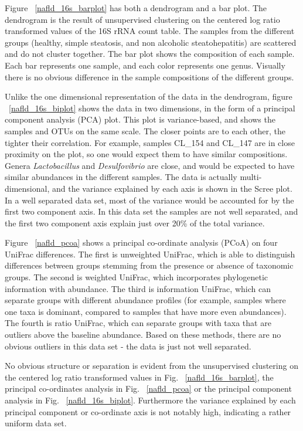 Figure ~\ref{nafld_16s_barplot} has both a dendrogram and a bar plot. The dendrogram is the result of unsupervised clustering on the centered log ratio transformed values of the 16S rRNA count table. The samples from the different groups (healthy, simple steatosis, and non alcoholic steatohepatitis) are scattered and do not cluster together. The bar plot shows the composition of each sample. Each bar represents one sample, and each color represents one genus. Visually there is no obvious difference in the sample compositions of the different groups.

Unlike the one dimensional representation of the data in the dendrogram, figure ~\ref{nafld_16s_biplot} shows the data in two dimensions, in the form of a principal component analysis (PCA) plot. This plot is variance-based, and shows the samples and OTUs on the same scale. The closer points are to each other, the tighter their correlation. For example, samples CL\_154 and CL\_147 are in close proximity on the plot, so one would expect them to have similar compositions. Genera \textit{Lactobacillus} and \textit{Desulfovibrio} are close, and would be expected to have similar abundances in the different samples. The data is actually multi-dimensional, and the variance explained by each axis is shown in the Scree plot. In a well separated data set, most of the variance would be accounted for by the first two component axis. In this data set the samples are not well separated, and the first two component axis explain just over 20\% of the total variance.

Figure ~\ref{nafld_pcoa} shows a principal co-ordinate analysis (PCoA) on four UniFrac differences. The first is unweighted UniFrac, which is able to distinguish differences between groups stemming from the presence or absence of taxonomic groups. The second is weighted UniFrac, which incorporates phylogenetic information with abundance. The third is information UniFrac, which can separate groups with different abundance profiles (for example, samples where one taxa is dominant, compared to samples that have more even abundances). The fourth is ratio UniFrac, which can separate groups with taxa that are outliers above the baseline abundance. Based on these methods, there are no obvious outliers in this data set - the data is just not well separated.

No obvious structure or separation is evident from the unsupervised clustering on the centered log ratio transformed values in Fig. ~\ref{nafld_16s_barplot}, the principal co-ordinates analysis in Fig. ~\ref{nafld_pcoa} or the principal component analysis in Fig. ~\ref{nafld_16s_biplot}. Furthermore the variance explained by each principal component or co-ordinate axis is not notably high, indicating a rather uniform data set.

